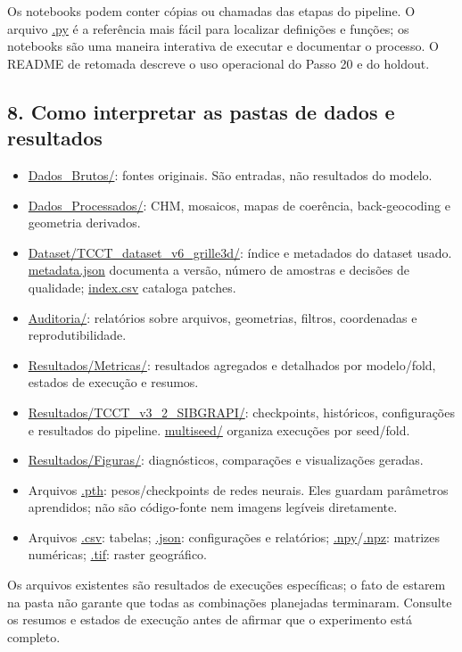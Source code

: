 \documentclass[11pt,a4paper]{article}
\begin{document}
Os notebooks podem conter cópias ou chamadas das etapas do pipeline. O arquivo \url{.py} é a referência mais fácil para localizar definições e funções; os notebooks são uma maneira interativa de executar e documentar o processo. O README de retomada descreve o uso operacional do Passo 20 e do holdout.

\subsection{8. Como interpretar as pastas de dados e resultados}
\begin{itemize}
\item \url{Dados_Brutos/}: fontes originais. São entradas, não resultados do modelo.
\item \url{Dados_Processados/}: CHM, mosaicos, mapas de coerência, back-geocoding e geometria derivados.
\item \url{Dataset/TCCT_dataset_v6_grille3d/}: índice e metadados do dataset usado. \url{metadata.json} documenta a versão, número de amostras e decisões de qualidade; \url{index.csv} cataloga patches.
\item \url{Auditoria/}: relatórios sobre arquivos, geometrias, filtros, coordenadas e reprodutibilidade.
\item \url{Resultados/Metricas/}: resultados agregados e detalhados por modelo/fold, estados de execução e resumos.
\item \url{Resultados/TCCT_v3_2_SIBGRAPI/}: checkpoints, históricos, configurações e resultados do pipeline. \url{multiseed/} organiza execuções por seed/fold.
\item \url{Resultados/Figuras/}: diagnósticos, comparações e visualizações geradas.
\item Arquivos \url{.pth}: pesos/checkpoints de redes neurais. Eles guardam parâmetros aprendidos; não são código-fonte nem imagens legíveis diretamente.
\item Arquivos \url{.csv}: tabelas; \url{.json}: configurações e relatórios; \url{.npy}/\url{.npz}: matrizes numéricas; \url{.tif}: raster geográfico.
\end{itemize}
Os arquivos existentes são resultados de execuções específicas; o fato de estarem na pasta não garante que todas as combinações planejadas terminaram. Consulte os resumos e estados de execução antes de afirmar que o experimento está completo.
\end{document}
